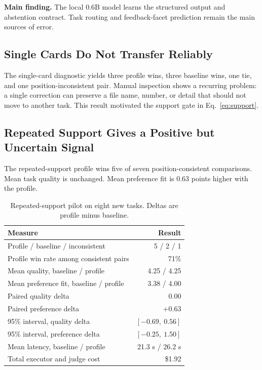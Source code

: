 \documentclass{article}
\newcommand{\finding}[1]{%
  \par\smallskip
  \noindent\colorbox{pgreen!13}{%
    \parbox{\dimexpr\linewidth-2\fboxsep\relax}{%
      \textbf{\textcolor{pgreen!42!black}{\faIcon{check-circle}\quad Main finding.}} #1%
    }}\par\smallskip}
\begin{document}
\finding{The local 0.6B model learns the structured output and abstention
contract. Task routing and feedback-facet prediction remain the main sources
of error.}

\subsection{Single Cards Do Not Transfer Reliably}

The single-card diagnostic yields three profile wins, three baseline wins, one
tie, and one position-inconsistent pair. Manual inspection shows a recurring
problem: a single correction can preserve a file name, number, or detail that
should not move to another task. This result motivated the support gate in
Eq.~\eqref{eq:support}.

\subsection{Repeated Support Gives a Positive but Uncertain Signal}

The repeated-support profile wins five of seven position-consistent
comparisons. Mean task quality is unchanged. Mean preference fit is 0.63 points
higher with the profile.

\begin{table}[t]
\centering
\small
\caption{Repeated-support pilot on eight new tasks. Deltas are profile minus
baseline.}
\label{tab:online}
\begin{tabular}{lr}
\toprule
\rowcolor{pgreen!28}
Measure & Result \\
\midrule
Profile / baseline / inconsistent & 5 / 2 / 1 \\
Profile win rate among consistent pairs & 71\% \\
Mean quality, baseline / profile & 4.25 / 4.25 \\
Mean preference fit, baseline / profile & 3.38 / 4.00 \\
Paired quality delta & 0.00 \\
Paired preference delta & $+0.63$ \\
95\% interval, quality delta & $[-0.69,\ 0.56]$ \\
95\% interval, preference delta & $[-0.25,\ 1.50]$ \\
Mean latency, baseline / profile & 21.3 s / 26.2 s \\
Total executor and judge cost & \$1.92 \\
\bottomrule
\end{tabular}
\end{table}
\end{document}
